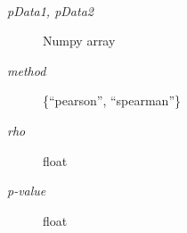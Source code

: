 \documentclass[letterpaper,10pt,english]{sphinxmanual}
\begin{document}
\begin{fulllineitems}
\label{index:halla.distance.cor}~\begin{description}
\item[{\emph{pData1, pData2}}] \leavevmode
Numpy array

\item[{\emph{method}}] \leavevmode
\{``pearson'', ``spearman''\}

\end{description}
\begin{description}
\item[{\emph{rho}}] \leavevmode
float

\item[{\emph{p-value}}] \leavevmode
float

\end{description}


\end{fulllineitems}
\end{document}
